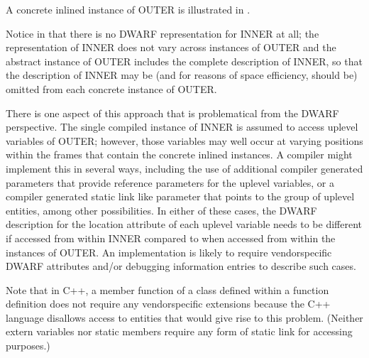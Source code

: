 A concrete inlined instance of OUTER is illustrated in
.

Notice in 
that there is no DWARF representation for
INNER at all; the representation of INNER does not vary across
instances of OUTER and the abstract instance of OUTER includes
the complete description of INNER, so that the description of
INNER may be (and for reasons of space efficiency, should be)
omitted from each concrete instance of OUTER.

There is one aspect of this approach that is problematical from
the DWARF perspective. The single compiled instance of INNER
is assumed to access up\dash level variables of OUTER; however,
those variables may well occur at varying positions within
the frames that contain the concrete inlined instances. A
compiler might implement this in several ways, including the
use of additional compiler generated parameters that provide
reference parameters for the up\dash level variables, or a compiler
generated static link like parameter that points to the group
of up\dash level entities, among other possibilities. In either of
these cases, the DWARF description for the location attribute
of each uplevel variable needs to be different if accessed
from within INNER compared to when accessed from within the
instances of OUTER. An implementation is likely to require
vendor\dash specific DWARF attributes and/or debugging information
entries to describe such cases.

Note that in C++, a member function of a class defined within
a function definition does not require any vendor\dash specific
extensions because the C++ language disallows access to
entities that would give rise to this problem. (Neither extern
variables nor static members require any form of static link
for accessing purposes.)

